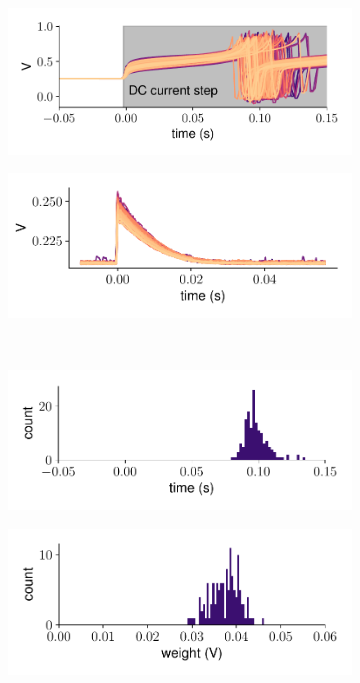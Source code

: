 \begin{figure}[h]
  \begin{subfigure}{.5\textwidth}
    \includegraphics[width=\textwidth]{img/chapter4/ttfs_waveforms.pdf}
    \subcaption{}
    \label{fig:spike_wfs}
  \end{subfigure}
  \begin{subfigure}{.475\textwidth}
    \includegraphics[width=\textwidth]{img/chapter4/epsp_c0c4.pdf}
    \subcaption{}
    \label{fig:epsp_wfs}
  \end{subfigure}\\
  \begin{subfigure}{.5\textwidth}
    \includegraphics[width=\textwidth]{img/chapter4/ttfs_distribution.pdf}
    \subcaption{}
    \label{fig:ttfs}
  \end{subfigure}
  \begin{subfigure}{.475\textwidth}
    \includegraphics[width=\textwidth]{img/chapter4/epsp_amplitudes_distribution.pdf}

\end{subfigure}
\end{figure}
